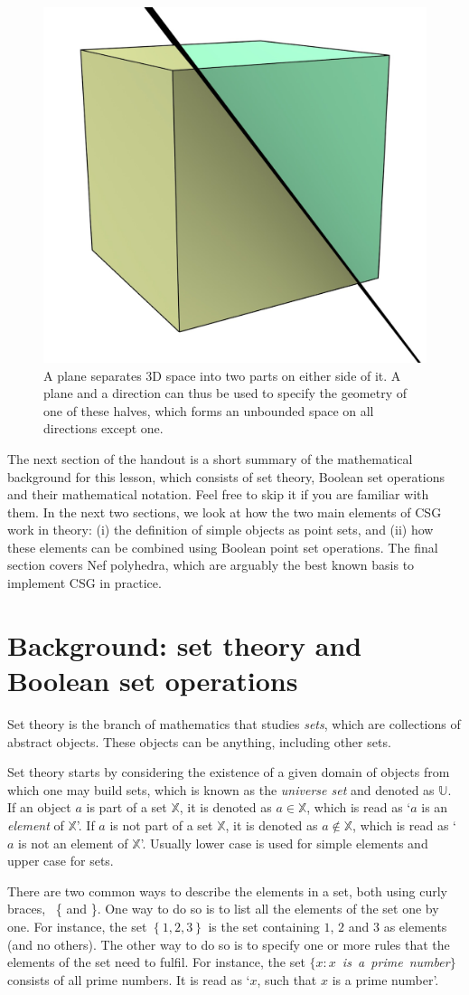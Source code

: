 \begin{figure}
\centering
\includegraphics[width=0.3\linewidth]{figs/halfspaces}
\caption{A plane separates 3D space into two parts on either side of it. A plane and a direction can thus be used to specify the geometry of one of these halves, which forms an unbounded space on all directions except one.}%
\label{fig:halfspaces}
\end{figure}

The next section of the handout is a short summary of the mathematical background for this lesson, which consists of set theory, Boolean set operations and their mathematical notation.
Feel free to skip it if you are familiar with them.
In the next two sections, we look at how the two main elements of CSG work in theory: (i) the definition of simple objects as point sets, and (ii) how these elements can be combined using Boolean point set operations.
The final section covers Nef polyhedra, which are arguably the best known basis to implement CSG in practice.

\section{Background: set theory and Boolean set operations}

Set theory is the branch of mathematics that studies \emph{sets}, which are collections of abstract objects.
These objects can be anything, including other sets.

Set theory starts by considering the existence of a given domain of objects from which one may build sets, which is known as the \emph{universe set} and denoted as \(\mathbb{U}\).
If an object \(a\) is part of a set \(\mathbb{X}\), it is denoted as \(a \in \mathbb{X}\), which is read as `\(a\) is an \emph{element} of \(\mathbb{X}\)'.
If \(a\) is not part of a set \(\mathbb{X}\), it is denoted as \(a \notin \mathbb{X}\), which is read as `\(a\) is not an element of \(\mathbb{X}\)'.
Usually lower case is used for simple elements and upper case for sets.

There are two common ways to describe the elements in a set, both using curly braces, \ie\ \{ and \}.
One way to do so is to list all the elements of the set one by one.
For instance, the set \(\left\{ 1,2,3 \right\}\) is the set containing \(1\), \(2\) and \(3\) as elements (and no others).
The other way to do so is to specify one or more rules that the elements of the set need to fulfil.
For instance, the set \(\{ x : x\)~\emph{is~a~prime~number}\(\}\) consists of all prime numbers.
It is read as `\(x\), such that \(x\) is a prime number'.

